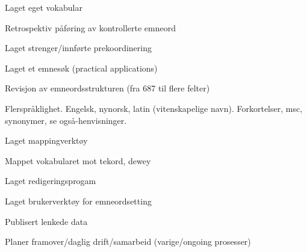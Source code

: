 Laget eget vokabular

Retrospektiv påføring av kontrollerte emneord

Laget strenger/innførte prekoordinering

Laget et emnesøk (practical applications)

Revisjon av emneordsstrukturen (fra 687 til flere felter)

Flerspråklighet. Engelsk, nynorsk, latin (vitenskapelige navn). Forkortelser, msc, 
synonymer, se også-henvisninger. 

Laget mappingverktøy

Mappet vokabularet mot tekord, dewey

Laget redigeringsprogam 

Laget brukerverktøy for emneordsetting

Publisert lenkede data

Planer framover/daglig drift/samarbeid (varige/ongoing prosesser)